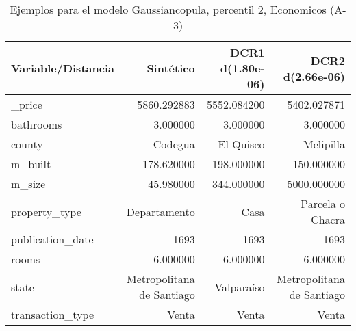 \begin{table}[H]
\centering
\fontsize{10}{14}\selectfont
\caption{Ejemplos para el modelo Gaussiancopula, percentil 2, Economicos (A-3)}
\label{table-example-economicos-a-3-gaussiancopula-2p}
\begin{tabular}{|l|r|r|r|}
\hline
\rowcolor[gray]{0.8}
Variable/Distancia & Sintético & DCR1 d(1.80e-06) & DCR2 d(2.66e-06) \\
\hline \_price & \cellcolor[rgb]{0.9, 0.54, 0.52} 5860.292883 & 5552.084200 & 5402.027871 \\
\hline bathrooms & \cellcolor[rgb]{0.9, 0.54, 0.52} 3.000000 & \cellcolor[rgb]{0.9, 0.54, 0.52} 3.000000 & \cellcolor[rgb]{0.9, 0.54, 0.52} 3.000000 \\
\hline county & \cellcolor[rgb]{0.9, 0.54, 0.52} Codegua & El Quisco & Melipilla \\
\hline m\_built & \cellcolor[rgb]{0.9, 0.54, 0.52} 178.620000 & 198.000000 & 150.000000 \\
\hline m\_size & \cellcolor[rgb]{0.9, 0.54, 0.52} 45.980000 & 344.000000 & 5000.000000 \\
\hline property\_type & \cellcolor[rgb]{0.9, 0.54, 0.52} Departamento & Casa & Parcela o Chacra \\
\hline publication\_date & \cellcolor[rgb]{0.9, 0.54, 0.52} 1693 & \cellcolor[rgb]{0.9, 0.54, 0.52} 1693 & \cellcolor[rgb]{0.9, 0.54, 0.52} 1693 \\
\hline rooms & \cellcolor[rgb]{0.9, 0.54, 0.52} 6.000000 & \cellcolor[rgb]{0.9, 0.54, 0.52} 6.000000 & \cellcolor[rgb]{0.9, 0.54, 0.52} 6.000000 \\
\hline state & \cellcolor[rgb]{0.9, 0.54, 0.52} Metropolitana de Santiago & Valparaíso & \cellcolor[rgb]{0.9, 0.54, 0.52} Metropolitana de Santiago \\
\hline transaction\_type & \cellcolor[rgb]{0.9, 0.54, 0.52} Venta & \cellcolor[rgb]{0.9, 0.54, 0.52} Venta & \cellcolor[rgb]{0.9, 0.54, 0.52} Venta \\
\hline
\end{tabular}
\end{table}
